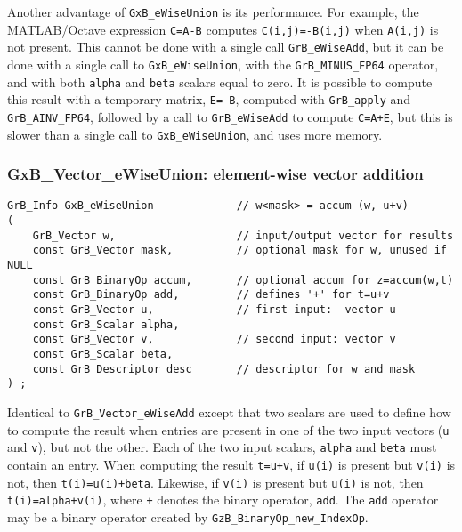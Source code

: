 \documentclass[12pt]{article}
\begin{document}
Another advantage of \verb'GxB_eWiseUnion' is its performance.  For example,
the MATLAB/Octave expression \verb'C=A-B' computes \verb'C(i,j)=-B(i,j)' when
\verb'A(i,j)' is not present.  This cannot be done with a single call
\verb'GrB_eWiseAdd', but it can be done with a single call to
\verb'GxB_eWiseUnion', with the \verb'GrB_MINUS_FP64' operator, and with both
\verb'alpha' and \verb'beta' scalars equal to zero.  It is possible to
compute this result with a temporary matrix, \verb'E=-B', computed with
\verb'GrB_apply' and \verb'GrB_AINV_FP64', followed by a call to
\verb'GrB_eWiseAdd' to compute \verb'C=A+E', but this is slower than a single
call to \verb'GxB_eWiseUnion', and uses more memory.

\newpage
\subsubsection{{\sf GxB\_Vector\_eWiseUnion:} element-wise vector addition}
\label{eWiseUnion_vector}

\begin{mdframed}[userdefinedwidth=6in]
{\footnotesize
\begin{verbatim}
GrB_Info GxB_eWiseUnion             // w<mask> = accum (w, u+v)
(
    GrB_Vector w,                   // input/output vector for results
    const GrB_Vector mask,          // optional mask for w, unused if NULL
    const GrB_BinaryOp accum,       // optional accum for z=accum(w,t)
    const GrB_BinaryOp add,         // defines '+' for t=u+v
    const GrB_Vector u,             // first input:  vector u
    const GrB_Scalar alpha,
    const GrB_Vector v,             // second input: vector v
    const GrB_Scalar beta,
    const GrB_Descriptor desc       // descriptor for w and mask
) ;
\end{verbatim} } \end{mdframed}

Identical to \verb'GrB_Vector_eWiseAdd' except that two scalars are used
to define how to compute the result when entries are present in one of
the two input vectors (\verb'u' and \verb'v'), but not the other.
Each of the two input scalars, \verb'alpha' and \verb'beta'
must contain an entry.
When computing the result \verb't=u+v',
if \verb'u(i)' is present but \verb'v(i)' is not, then \verb't(i)=u(i)+beta'.
Likewise,
if \verb'v(i)' is present but \verb'u(i)' is not, then \verb't(i)=alpha+v(i)',
where \verb'+' denotes the binary operator, \verb'add'.
%
The \verb'add' operator may be a binary operator
created by \verb'GzB_BinaryOp_new_IndexOp'.
\end{document}
